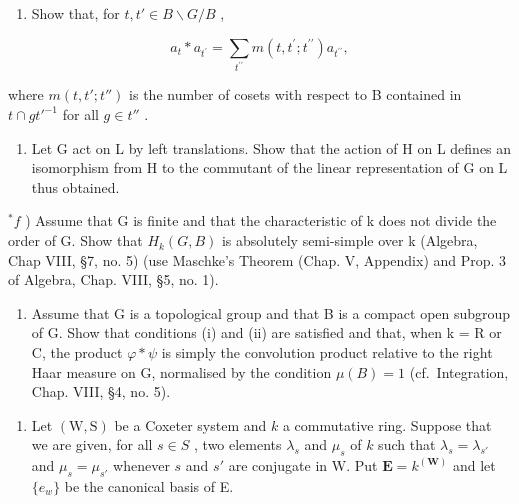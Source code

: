 \begin{enumerate}
\def\labelenumi{\alph{enumi})}
\setcounter{enumi}{3}
\tightlist
\item
  Show that, for \(t, t' \in B \backslash G / B\) ,
\end{enumerate}

\[
a _ {t} * a _ {t ^ {\prime}} = \sum_ {t ^ {\prime \prime}} m (t, t ^ {\prime}; t ^ {\prime \prime}) a _ {t ^ {\prime \prime}},
\]

where \(m(t, t'; t'')\) is the number of cosets with respect to B contained in \(t \cap gt'^{-1}\) for all \(g \in t''\) .

\begin{enumerate}
\def\labelenumi{\alph{enumi})}
\setcounter{enumi}{4}
\tightlist
\item
  Let G act on L by left translations. Show that the action of H on L defines an isomorphism from H to the commutant of the linear representation of G on L thus obtained.
\end{enumerate}

\(^{*}f\) ) Assume that G is finite and that the characteristic of k does not divide the order of G. Show that \(H_{k}(G,B)\) is absolutely semi-simple over k (Algebra, Chap VIII, §7, no. 5) (use Maschke's Theorem (Chap. V, Appendix) and Prop. 3 of Algebra, Chap. VIII, §5, no. 1).

\begin{enumerate}
\def\labelenumi{\alph{enumi})}
\setcounter{enumi}{6}
\tightlist
\item
  Assume that G is a topological group and that B is a compact open subgroup of G. Show that conditions (i) and (ii) are satisfied and that, when k = R or C, the product \(\varphi * \psi\) is simply the convolution product relative to the right Haar measure on G, normalised by the condition \(\mu(B) = 1\) (cf.~Integration, Chap. VIII, §4, no. 5).
\end{enumerate}
\relax{}
\begin{enumerate}
\def\labelenumi{\arabic{enumi})}
\setcounter{enumi}{22}
\tightlist
\item
  Let \((\mathrm{W},\mathrm{S})\) be a Coxeter system and \(k\) a commutative ring. Suppose that we are given, for all \(s\in S\) , two elements \(\lambda_{s}\) and \(\mu_s\) of \(k\) such that \(\lambda_{s} = \lambda_{s'}\) and \(\mu_{s} = \mu_{s'}\) whenever \(s\) and \(s'\) are conjugate in W. Put \(\mathbf{E} = k^{(\mathbf{W})}\) and let \(\{e_w\}\) be the canonical basis of E.
\end{enumerate}

